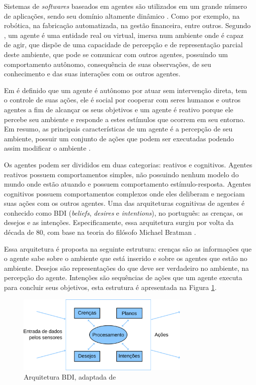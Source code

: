 \documentclass[conference]{IEEEtran}
\begin{document}
    Sistemas de \textit{softwares} baseados em agentes são utilizados em um grande número de aplicações, sendo seu domínio altamente dinâmico \cite{evertsz2015using}. Como por exemplo, na robótica, na fabricação automatizada, na gestão financeira, entre outros. Segundo \cite{ferber1991tutorial}, um agente é uma entidade real ou virtual, imersa num ambiente onde é capaz de agir, que dispõe de uma capacidade de percepção e de representação parcial deste ambiente, que pode se comunicar com outros agentes, possuindo um comportamento autônomo, consequência de suas observações, de seu conhecimento e das suas interações com os outros agentes.
        
        Em \cite{bellifemine2007developing} é definido que um agente é autônomo por atuar sem intervenção direta, tem o controle de suas ações, ele é social por cooperar com seres humanos e outros agentes a fim de alcançar os seus objetivos e um agente é reativo porque ele percebe seu ambiente e responde a estes estímulos que ocorrem em seu entorno. Em resumo, as principais características de um agente é a percepção de seu ambiente, possuir um conjunto de ações que podem ser executadas podendo assim modificar o ambiente \cite{bordini2007programming}.
        
        Os agentes podem ser divididos em duas categorias: reativos e cognitivos. Agentes reativos possuem comportamentos simples, não possuindo nenhum modelo do mundo onde estão atuando e possuem comportamento estímulo-resposta. Agentes cognitivos possuem comportamentos complexos onde eles deliberam e negociam suas ações com os outros agentes. Uma das arquiteturas cognitivas de agentes é conhecido como BDI (\textit{beliefs}, \textit{desires} e \textit{intentions}), no português: as crenças, os desejos e as intenções. Especificamente, essa arquitetura surgiu por volta da década de 80, com base na teoria do filósofo Michael Bratman \cite{sichman2003raciocinio}.

        Essa arquitetura é proposta na seguinte estrutura: crenças são as informações que o agente sabe sobre o ambiente que está inserido e sobre os agentes que estão no ambiente. Desejos são representações do que deve ser verdadeiro no ambiente, na percepção do agente. Intenções são sequências de ações que um agente executa para concluir seus objetivos, esta estrutura é apresentada na Figura \ref{fig:bdi}.
        
        \begin{figure}[ht]
            \begin{center}
                \includegraphics[width=3.3in]{BDI.png}
            \end{center}
            \caption{Arquitetura BDI, adaptada de \cite{weiss1999multiagent}}
            \label{fig:bdi}
        \end{figure}
        
\end{document}

